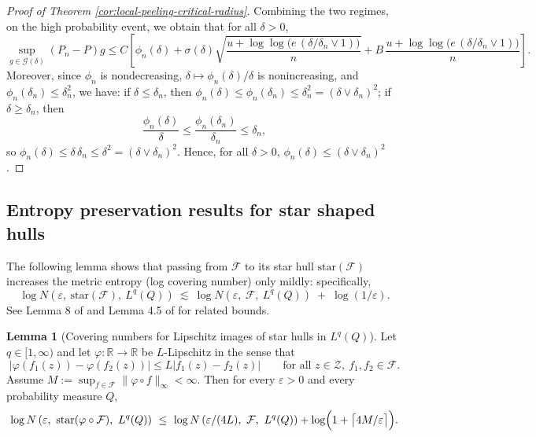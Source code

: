 \documentclass[11pt]{article}
\theoremstyle{plain}
\theoremstyle{definition} %
\newtheorem{lemma}{Lemma}
\begin{document}
\begin{proof}[Proof of Theorem \ref{cor:local-peeling-critical-radius}]
Combining the two regimes, on the high probability event, we obtain that for all \(\delta>0\),
\[
\sup_{g\in\mathcal G(\delta)} (P_n-P)g
\le
C\left[
\phi_n(\delta)
+
\sigma(\delta)
\sqrt{\frac{u+\log\log\!\bigl(e\,(\delta/\delta_n\vee 1)\bigr)}{n}}
+
B\,\frac{u+\log\log\!\bigl(e\,(\delta/\delta_n\vee 1)\bigr)}{n}
\right].
\]
Moreover, since \(\phi_n\) is nondecreasing, \(\delta\mapsto \phi_n(\delta)/\delta\) is nonincreasing, and
\(\phi_n(\delta_n)\le \delta_n^2\), we have: if \(\delta\le \delta_n\), then
\(\phi_n(\delta)\le \phi_n(\delta_n)\le \delta_n^2=(\delta\vee\delta_n)^2\); if
\(\delta\ge \delta_n\), then
\[
\frac{\phi_n(\delta)}{\delta}
\le
\frac{\phi_n(\delta_n)}{\delta_n}
\le
\delta_n,
\]
so \(\phi_n(\delta)\le \delta\,\delta_n\le \delta^2=(\delta\vee\delta_n)^2\).
Hence, for all \(\delta>0\), \(\phi_n(\delta)\le (\delta\vee\delta_n)^2\).
\end{proof}
 


\subsection{Entropy preservation results for star shaped hulls}

The following lemma shows that passing from $\mathcal F$ to its star hull $\mathrm{star}(\mathcal F)$ increases the metric entropy (log covering number) only mildly: specifically,
\[
\log N\left(\varepsilon,\ \mathrm{star}(\mathcal F),\ L^q(Q)\right)
\ \lesssim\
\log N\left(\varepsilon,\ \mathcal F,\ L^q(Q)\right)
\;+\;
\log(1/\varepsilon).
\]
See Lemma 8 of \cite{foster2023orthogonal}  and Lemma 4.5 of \cite{mendelson2002improving} for related bounds.





\begin{lemma}[Covering numbers for Lipschitz images of star hulls in $L^q(Q)$]
\label{lem:cover_star_hull_lip_Lq}
Let $q\in[1,\infty)$ and let $\varphi:\mathbb R\to\mathbb R$ be $L$-Lipschitz in the sense that
\[
|\varphi(f_1(z))-\varphi(f_2(z))|
\le
L|f_1(z)-f_2(z)|
\qquad
\text{for all }z\in\mathcal Z,\ f_1,f_2\in\mathcal F.
\]
Assume $M:=\sup_{f\in\mathcal F}\|\varphi\circ f\|_\infty<\infty$. Then for every $\varepsilon>0$ and every probability measure $Q$,
\[
\log N\left(\varepsilon,\ \mathrm{star}(\varphi\circ\mathcal F),\ L^q(Q)\right)
\ \le\
\log N\left(\varepsilon/(4L),\ \mathcal F,\ L^q(Q)\right)
+
\log\Bigl(1+\bigl\lceil 4M/\varepsilon\bigr\rceil\Bigr).
\]
\end{lemma}
\end{document}

